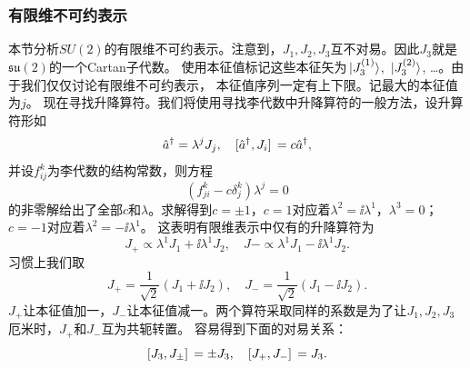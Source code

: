 \subsubsection{有限维不可约表示}

本节分析$SU(2)$的有限维不可约表示。注意到，$J_1, J_2, J_3$互不对易。因此$J_3$就是$\mathfrak{su}(2)$的一个Cartan子代数。
使用本征值标记这些本征矢为$\ket*{J_3^{(1)}}$, $\ket*{J_3^{(2)}}$, \dots。由于我们仅仅讨论有限维不可约表示，
本征值序列一定有上下限。记最大的本征值为$j$。
现在寻找升降算符。我们将使用寻找李代数中升降算符的一般方法，设升算符形如
\[
    \hat{a}^\dagger = \lambda^j J_j, \quad \comm*{\hat{a}^\dagger}{J_i} = c \hat{a}^\dagger,
\]
并设$f_{ij}^k$为李代数的结构常数，则方程
\[
    (f_{ji}^k - c \delta_j^k) \lambda^j = 0
\]
的非零解给出了全部$c$和$\lambda$。求解得到$c = \pm 1$，$c=1$对应着$\lambda^2 = \ii \lambda^1$，$\lambda^3 = 0$；$c=-1$对应着$\lambda^2 = - \ii \lambda^1$。
这表明有限维表示中仅有的升降算符为
\[
    J_+ \propto \lambda^1 J_1 + \ii \lambda^1 J_2, \quad J- \propto \lambda^1 J_1 - \ii \lambda^1 J_2. 
\]
习惯上我们取
\begin{equation}
    J_+ = \frac{1}{\sqrt{2}} (J_1 + \ii J_2), \quad J_- = \frac{1}{\sqrt{2}} (J_1 - \ii J_2).
\end{equation}
$J_+$让本征值加一，$J_-$让本征值减一。两个算符采取同样的系数是为了让$J_1,J_2,J_3$厄米时，$J_+$和$J_-$互为共轭转置。
容易得到下面的对易关系：
\begin{equation}
    \comm*{J_3}{J_{\pm}} = \pm J_3, \quad \comm*{J_+}{J_-} = J_3.
\end{equation}

